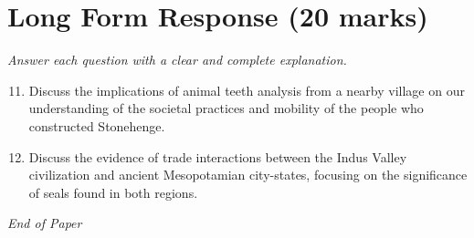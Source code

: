 \documentclass[12pt]{article}
\begin{document}
\section*{Long Form Response (20 marks)}
\textit{Answer each question with a clear and complete explanation.}
\begin{enumerate}[label=\arabic*.]
\setcounter{enumi}{10}
\item Discuss the implications of animal teeth analysis from a nearby village on our
understanding of the societal practices and mobility of the people who constructed
Stonehenge.
\item Discuss the evidence of trade interactions between the Indus Valley civilization and
ancient Mesopotamian city-states, focusing on the significance of seals found in both
regions.
\end{enumerate}

\vfill
\noindent\textit{End of Paper}
\end{document}
